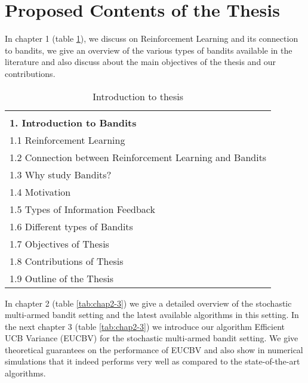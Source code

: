 \documentclass[MS,synopsis]{iitmdiss}
\begin{document}

\section{Proposed Contents of the Thesis}

In chapter 1 (table \ref{tab:chap1}), we discuss on Reinforcement Learning and its connection to bandits, we give an overview of the various types of bandits available in the literature and also discuss about the main objectives of the thesis and our contributions. 


\begin{table}[!th]
\begin{center}
\begin{tabular}{|p{26em}|}
\hline\\
\textbf{1. Introduction to Bandits} \\\hline
1.1 Reinforcement Learning \\
1.2 Connection between Reinforcement Learning and Bandits \\
1.3 Why study Bandits?\\
1.4 Motivation \\
1.5 Types of Information Feedback\\
1.6 Different types of Bandits\\
1.7 Objectives of Thesis\\
1.8 Contributions of Thesis\\
1.9 Outline of the Thesis\\
\hline
\end{tabular}
\end{center}
\caption{Introduction to thesis}
\label{tab:chap1}
\end{table}


In chapter 2 (table \ref{tab:chap2-3}) we give a detailed overview of the stochastic multi-armed bandit setting and the latest available algorithms in this setting. In the next chapter 3 (table \ref{tab:chap2-3}) we introduce our algorithm Efficient UCB Variance (EUCBV) for the stochastic multi-armed bandit setting. We give theoretical guarantees on the performance of EUCBV and also show in numerical simulations that it indeed performs very well as compared to the state-of-the-art algorithms. 
\end{document}
